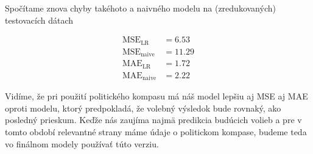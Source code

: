 \documentclass[main.tex]{subfiles}
\begin{document}
Spočítame znova chyby takéhoto a naivného modelu na (zredukovaných) testovacích dátach

\begin{align*}
	\operatorname{MSE}_{\operatorname{LR}} &= 6.53 \\
	\operatorname{MSE}_{\operatorname{naive}} &= 11.29 \\
	\operatorname{MAE}_{\operatorname{LR}} &= 1.72 \\
	\operatorname{MAE}_{\operatorname{naive}} &= 2.22
\end{align*}

Vidíme, že pri použití politického kompasu má náš model lepšiu aj MSE aj MAE oproti modelu, ktorý predpokladá, že volebný výsledok bude rovnaký, ako posledný prieskum. Keďže nás zaujíma najmä predikcia budúcich volieb a pre v tomto období relevantné strany máme údaje o politickom kompase, budeme teda vo finálnom modely používať túto verziu.
\end{document}
